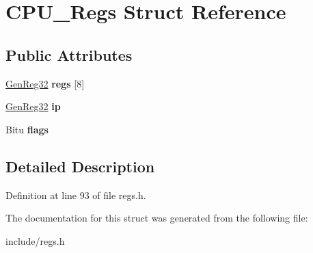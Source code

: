 \hypertarget{structCPU__Regs}{\section{C\-P\-U\-\_\-\-Regs Struct Reference}
\label{structCPU__Regs}
}
\subsection*{Public Attributes}
\begin{DoxyCompactItemize}
\item 
\hypertarget{structCPU__Regs_a6f5b4be1534c1945b6a5151916c58f22}{\hyperlink{unionGenReg32}{Gen\-Reg32} {\bfseries regs} \mbox{[}8\mbox{]}}\label{structCPU__Regs_a6f5b4be1534c1945b6a5151916c58f22}

\item 
\hypertarget{structCPU__Regs_a5909e97c27b5e23c065f12d34c5ae884}{\hyperlink{unionGenReg32}{Gen\-Reg32} {\bfseries ip}}\label{structCPU__Regs_a5909e97c27b5e23c065f12d34c5ae884}

\item 
\hypertarget{structCPU__Regs_a1af5991d3f3a821f78c19e9a88a60bf7}{Bitu {\bfseries flags}}\label{structCPU__Regs_a1af5991d3f3a821f78c19e9a88a60bf7}

\end{DoxyCompactItemize}


\subsection{Detailed Description}


Definition at line 93 of file regs.\-h.



The documentation for this struct was generated from the following file\-:\begin{DoxyCompactItemize}
\item 
include/regs.\-h\end{DoxyCompactItemize}
